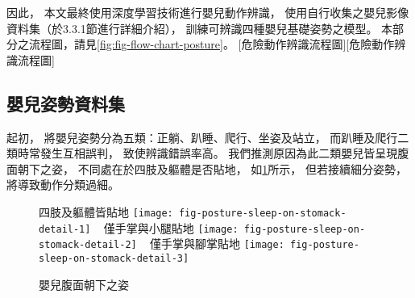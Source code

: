 \documentclass[class=NCU_thesis, crop=false]{standalone}
\begin{document}
因此，
本文最終使用深度學習技術進行嬰兒動作辨識，
使用自行收集之嬰兒影像資料集（於3.3.1節進行詳細介紹），
訓練可辨識四種嬰兒基礎姿勢之模型。
本部分之流程圖，請見\cref{fig:fig-flow-chart-posture}。
[危險動作辨識流程圖][危險動作辨識流程圖]

\subsection{嬰兒姿勢資料集}

起初，
將嬰兒姿勢分為五類：正躺、趴睡、爬行、坐姿及站立，
而趴睡及爬行二類時常發生互相誤判，
致使辨識錯誤率高。
我們推測原因為此二類嬰兒皆呈現腹面朝下之姿，
不同處在於四肢及軀體是否貼地，
如\cref{fig:fig-posture-sleep-on-stomack-detail}所示，
但若接續細分姿勢，
將導致動作分類過細。
\begin{figure}[!hbt]
    \centering
    \subcaptionbox
        {四肢及軀體皆貼地
        \label{fig:fig-posture-sleep-on-stomack-detail-1}}
        {\texttt{[image: fig-posture-sleep-on-stomack-detail-1]}}
    ~
    \subcaptionbox
        {僅手掌與小腿貼地
        \label{fig:fig-posture-sleep-on-stomack-detail-2}}
        {\texttt{[image: fig-posture-sleep-on-stomack-detail-2]}}
    ~
    \subcaptionbox
        {僅手掌與腳掌貼地
        \label{fig:fig-posture-sleep-on-stomack-detail-3}}
        {\texttt{[image: fig-posture-sleep-on-stomack-detail-3]}}
    \caption{嬰兒腹面朝下之姿}
    \label{fig:fig-posture-sleep-on-stomack-detail}
\end{figure}
\end{document}
